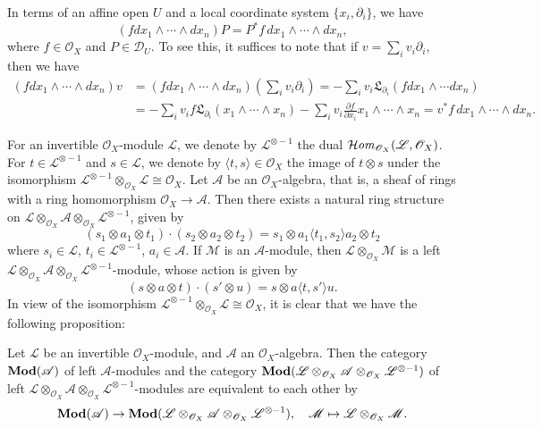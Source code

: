 \begin{remark}\label{D-module Omega_X module structure expression}
In terms of an affine open $U$ and a local coordinate system $\{x_i,\partial_i\}$, we have
\begin{equation}\label{D-module Omega_X module structure expression-1}
(fdx_1\wedge\cdots\wedge dx_n)P=P^*f\,dx_1\wedge\cdots\wedge dx_n,
\end{equation}
where $f\in\mathscr{O}_X$ and $P\in\mathscr{D}_U$. To see this, it suffices to note that if $v=\sum_iv_i\partial_i$, then we have
\begin{align*}
(fdx_1\wedge\cdots\wedge dx_n)v&=(fdx_1\wedge\cdots\wedge dx_n)(\sum_iv_i\partial_i)=-\sum_iv_i\mathfrak{L}_{\partial_i}(fdx_1\wedge\cdots dx_n)\\
&=-\sum_iv_if\mathfrak{L}_{\partial_i}(x_1\wedge\cdots\wedge x_n)-\sum_iv_i\frac{\partial f}{\partial x_i}x_1\wedge\cdots\wedge x_n=v^*f\,dx_1\wedge\cdots\wedge dx_n.
\end{align*}
\end{remark}

For an invertible $\mathscr{O}_X$-module $\mathscr{L}$, we denote by $\mathscr{L}^{\otimes -1}$ the dual $\operatorname{\mathcal{H}\hspace*{-0.4pt}\textit{om}\hspace{0.5pt}}_{\mathscr{O}_X}(\mathscr{L},\mathscr{O}_X)$. For $t\in\mathscr{L}^{\otimes -1}$ and $s\in\mathscr{L}$, we denote by $\langle t,s\rangle\in\mathscr{O}_X$ the image of $t\otimes s$ under the isomorphism $\mathscr{L}^{\otimes -1}\otimes_{\mathscr{O}_X}\mathscr{L}\cong\mathscr{O}_X$. Let $\mathscr{A}$ be an $\mathscr{O}_X$-algebra, that is, a sheaf of rings with a ring homomorphism $\mathscr{O}_X\to\mathscr{A}$. Then there exists a natural ring structure on $\mathscr{L}\otimes_{\mathscr{O}_X}\mathscr{A}\otimes_{\mathscr{O}_X}\mathscr{L}^{\otimes -1}$, given by
\[(s_1\otimes a_1\otimes t_1)\cdot(s_2\otimes a_2\otimes t_2)=s_1\otimes a_1\langle t_1,s_2\rangle a_2\otimes t_2\]
where $s_i\in\mathscr{L}$, $t_i\in\mathscr{L}^{\otimes -1}$, $a_i\in\mathscr{A}$. If $\mathscr{M}$ is an $\mathscr{A}$-module, then $\mathscr{L}\otimes_{\mathscr{O}_X}\mathscr{M}$ is a left $\mathscr{L}\otimes_{\mathscr{O}_X}\mathscr{A}\otimes_{\mathscr{O}_X}\mathscr{L}^{\otimes -1}$-module, whose action is given by
\[(s\otimes a\otimes t)\cdot(s'\otimes u)=s\otimes a\langle t,s'\rangle u.\]
In view of the isomorphism $\mathscr{L}^{\otimes -1}\otimes_{\mathscr{O}_X}\mathscr{L}\cong\mathscr{O}_X$, it is clear that we have the following proposition:
\begin{proposition}\label{D-module equivalence of twisted module category}
Let $\mathscr{L}$ be an invertible $\mathscr{O}_X$-module, and $\mathscr{A}$ an $\mathscr{O}_X$-algebra. Then the category $\mathbf{Mod}(\mathscr{A})$ of left $\mathscr{A}$-modules and the category $\mathbf{Mod}(\mathscr{L}\otimes_{\mathscr{O}_X}\mathscr{A}\otimes_{\mathscr{O}_X}\mathscr{L}^{\otimes -1})$ of left $\mathscr{L}\otimes_{\mathscr{O}_X}\mathscr{A}\otimes_{\mathscr{O}_X}\mathscr{L}^{\otimes -1}$-modules are equivalent to each other by
\[\mathbf{Mod}(\mathscr{A})\to \mathbf{Mod}(\mathscr{L}\otimes_{\mathscr{O}_X}\mathscr{A}\otimes_{\mathscr{O}_X}\mathscr{L}^{\otimes -1}),\quad \mathscr{M}\mapsto \mathscr{L}\otimes_{\mathscr{O}_X}\mathscr{M}.\]
\end{proposition}

